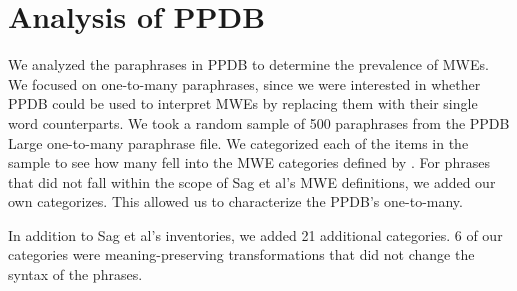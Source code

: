 \documentclass[11pt]{article}
\begin{document}
\section{Analysis of PPDB}\label{analysis}
We analyzed the paraphrases in PPDB to determine the prevalence of MWEs.  We focused on one-to-many paraphrases, since we were interested in whether PPDB could be used to interpret MWEs by replacing them with their single word counterparts. 
We took a random  sample of 500 paraphrases from the PPDB Large one-to-many paraphrase file.  We categorized each of the items in the sample to see how many fell into the MWE categories defined by .  For phrases that did not fall within the scope of Sag et al's MWE definitions, we added our own categorizes.  This allowed us to characterize the PPDB's one-to-many.



In addition to Sag et al's inventories, we added 21 additional categories.  6 of our categories were meaning-preserving transformations that did not change the syntax of the phrases. 
\end{document}

